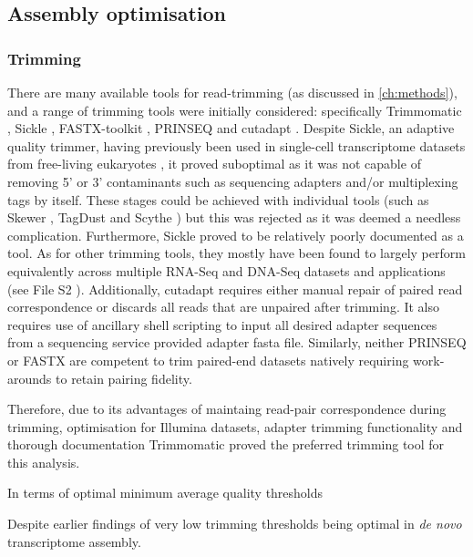 \subsection{Assembly optimisation}

\subsubsection{Trimming}

There are many available tools for read-trimming (as discussed in \ref{ch:methods}),
and a range of trimming tools were initially
considered: specifically Trimmomatic \citep{Bolger2014a}, Sickle \citep{JoshiGitHub}, FASTX-toolkit \citep{gordon2010fastx},
PRINSEQ \citep{Schmieder2011} and cutadapt \citep{martin2011cutadapt}. 
Despite Sickle, an adaptive quality trimmer, having previously been used in single-cell transcriptome datasets 
from free-living eukaryotes \citep{Kolisko2014}, it proved suboptimal as it was
not capable of removing 5' or 3' contaminants such as sequencing adapters and/or multiplexing tags by itself.  
These stages could be achieved with individual tools (such as Skewer \citep{Jiang2014}, 
TagDust \citep{Lassmann2009} and Scythe \citep{Buffalo}) but this was rejected as it was
deemed a needless complication.  Furthermore, Sickle proved to be relatively poorly documented
as a tool.   As for other trimming tools, they mostly have  
been found to largely perform equivalently across multiple RNA-Seq and DNA-Seq datasets and applications 
(see File S2 \citep{DelFabbro2013}).  Additionally, cutadapt requires either manual repair of 
paired read correspondence or discards all reads that are unpaired after trimming. It also requires
use of ancillary shell scripting to input all desired adapter sequences from a sequencing service
provided adapter fasta file.  Similarly, neither PRINSEQ or FASTX are competent to trim paired-end datasets 
natively requiring work-arounds to retain pairing fidelity.

Therefore, due to its advantages of maintaing read-pair correspondence during trimming, 
optimisation for Illumina datasets, adapter trimming functionality and thorough documentation
Trimmomatic \citep{Bolger2014a} proved the preferred trimming tool for this analysis.


In terms of optimal minimum average quality thresholds  



Despite earlier findings of very low trimming thresholds being optimal in \textit{de novo}
transcriptome assembly.   


